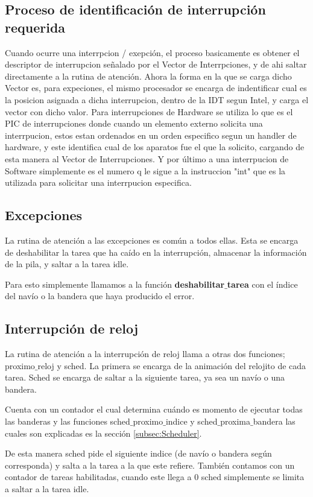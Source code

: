 \subsection{Proceso de identificación de interrupción requerida}
\par{Cuando ocurre una interrpcion / exepción, el proceso basicamente es obtener el descriptor de interrupcion señalado por el Vector de Interrpciones, y de ahi saltar directamente a la rutina de atención. Ahora la forma en la que se carga dicho Vector es, para expeciones, el mismo procesador se encarga de indentificar cual es la posicion asignada a dicha interrupcion, dentro de la IDT segun Intel, y carga el vector con dicho valor.  Para interrupciones de Hardware se utiliza lo que es el PIC de interrupciones donde cuando un elemento externo solicita una interrpucion, estos estan ordenados en un orden especifico segun un handler de hardware, y este identifica cual de los aparatos fue el que la solicito, cargando de esta manera al Vector de Interrupciones. Y por último a una interrpucion de Software simplemente es el numero q le sigue a la instruccion "int" que es la utilizada para solicitar una interrpucion especifica.}

\subsection{Excepciones}
\par{La rutina de atención a las excepciones es común a todos ellas. Esta se encarga de deshabilitar la tarea que ha caído en la interrupción, almacenar la información de la pila, y saltar a la tarea idle.}
\par{Para esto simplemente llamamos a la función \textbf{deshabilitar$\_$tarea} con el índice del navío o la bandera que haya producido el error.}
\subsection{Interrupción de reloj}
\par{La rutina de atención a la interrupción de reloj llama a otras dos funciones; proximo$\_$reloj y sched. La primera se encarga de la animación del relojito de cada tarea. Sched se encarga de saltar a la siguiente tarea, ya sea un navío o una bandera.}
\par{Cuenta con un contador el cual determina cuándo es momento de ejecutar todas las banderas y las funciones sched$\_$proximo$\_$indice y sched$\_$proxima$\_$bandera las cuales son explicadas es la sección \ref{subsec:Scheduler}.}
\par{De esta manera sched pide el siguiente indice (de navío o bandera según corresponda) y salta a la tarea a la que este refiere. También contamos con un contador de tareas habilitadas, cuando este llega a 0 sched simplemente se limita a saltar a la tarea idle.}

